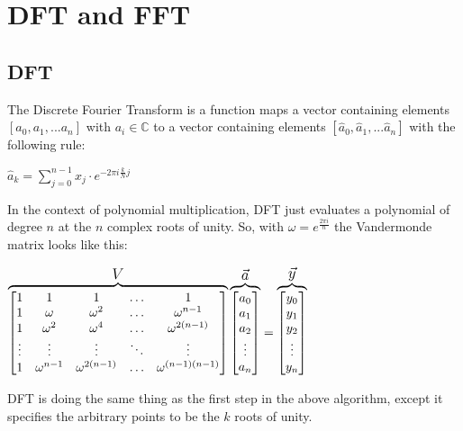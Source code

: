 \documentclass{article}
\begin{document}
\section{DFT and FFT}
\subsection{DFT}
The Discrete Fourier Transform is a function maps a vector containing elements $[a_0, a_1, ... a_n]$ with $a_i\in \mathbb{C}$ to a vector containing elements $[\hat{a}_0, \hat{a}_1, ... \hat{a}_n]$ with the following rule:

$\hat{a}_k = \displaystyle\sum\limits_{j=0}^{n-1} x_j\cdot e^{-2\pi i \frac{k}{N}j}$

In the context of polynomial multiplication, DFT just evaluates a polynomial of degree $n$ at the $n$ complex roots of unity. So, with $\omega = e^{\frac{2\pi i}{n}}$ the Vandermonde matrix looks like this:

\centerline{
    $
    \overbrace{
        \begin{bmatrix}
            1 & 1 & 1 & \ldots & 1 \\
            1 & \omega & \omega^2 & \ldots & \omega^{n-1} \\
            1 & \omega^2 & \omega^4 & \ldots & \omega^{2(n-1)} \\
            \vdots & \vdots & \vdots & \ddots & \vdots \\
            1 & \omega^{n-1} & \omega^{2(n-1)} & \ldots & \omega^{(n-1)(n-1)} \\
        \end{bmatrix}
    }^{\text{\large $V$}}
    \overbrace{
        \begin{bmatrix}
            a_0 \\ a_1 \\ a_2 \\ \vdots \\ a_n 
        \end{bmatrix}
    }^{\text{\large $\vec{a}$}} = 
    \overbrace{
        \begin{bmatrix}
            y_0 \\ y_1 \\ y_2 \\ \vdots \\ y_n 
        \end{bmatrix}
    }^{\text{\large $\vec{y}$}}
    $
}

DFT is doing the same thing as the first step in the above algorithm, except it specifies the arbitrary points to be the $k$ roots of unity.
\end{document}
